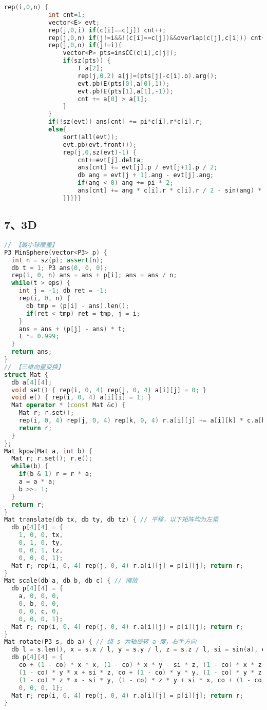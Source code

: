 \begin{lstlisting}[language=C++]
		rep(i,0,n) {
			int cnt=1;
			vector<E> evt;
			rep(j,0,i) if(c[i]==c[j]) cnt++;
			rep(j,0,n) if(j!=i&&!(c[i]==c[j])&&overlap(c[j],c[i])) cnt++;
			rep(j,0,n) if(j!=i){
				vector<P> pts=insCC(c[i],c[j]);
				if(sz(pts)) {
					T a[2];
					rep(j,0,2) a[j]=(pts[j]-c[i].o).arg();
					evt.pb(E(pts[0],a[0],1));
					evt.pb(E(pts[1],a[1],-1));
					cnt += a[0] > a[1];
				}
			}
			if(!sz(evt)) ans[cnt] += pi*c[i].r*c[i].r;
			else{
				sort(all(evt));
				evt.pb(evt.front());
				rep(j,0,sz(evt)-1) {
					cnt+=evt[j].delta;
					ans[cnt] += evt[j].p / evt[j+1].p / 2;
					db ang = evt[j + 1].ang - evt[j].ang;
					if(ang < 0) ang += pi * 2;
					ans[cnt] += ang * c[i].r * c[i].r / 2 - sin(ang) * c[i].r * c[i].r / 2;
				}}}}}
\end{lstlisting}
\subsection{7、3D}
\begin{lstlisting}[language=C++]
// 【最小球覆盖】
P3 MinSphere(vector<P3> p) {
  int n = sz(p); assert(n);
  db t = 1; P3 ans(0, 0, 0);
  rep(i, 0, n) ans = ans + p[i]; ans = ans / n;
  while(t > eps) {
    int j = -1; db ret = -1;
    rep(i, 0, n) {
      db tmp = (p[i] - ans).len();
      if(ret < tmp) ret = tmp, j = i;
    }
    ans = ans + (p[j] - ans) * t;
    t *= 0.999;
  }
  return ans;
}
// 【三维向量变换】
struct Mat {
  db a[4][4];
  void set() { rep(i, 0, 4) rep(j, 0, 4) a[i][j] = 0; }
  void e() { rep(i, 0, 4) a[i][i] = 1; }
  Mat operator * (const Mat &c) {
    Mat r; r.set();
    rep(i, 0, 4) rep(j, 0, 4) rep(k, 0, 4) r.a[i][j] += a[i][k] * c.a[k][j];
    return r;
  }
};
Mat kpow(Mat a, int b) {
  Mat r; r.set(); r.e();
  while(b) {
    if(b & 1) r = r * a;
    a = a * a;
    b >>= 1;
  }
  return r;
}
Mat translate(db tx, db ty, db tz) { // 平移，以下矩阵均为左乘
  db p[4][4] = {
    1, 0, 0, tx, 
    0, 1, 0, ty,
    0, 0, 1, tz,
    0, 0, 0, 1};
  Mat r; rep(i, 0, 4) rep(j, 0, 4) r.a[i][j] = p[i][j]; return r;
}
Mat scale(db a, db b, db c) { // 缩放
  db p[4][4] = {
    a, 0, 0, 0,
    0, b, 0, 0,
    0, 0, c, 0,
    0, 0, 0, 1};
  Mat r; rep(i, 0, 4) rep(j, 0, 4) r.a[i][j] = p[i][j]; return r;
}
Mat rotate(P3 s, db a) { // 绕 s 为轴旋转 a 度，右手方向
  db l = s.len(), x = s.x / l, y = s.y / l, z = s.z / l, si = sin(a), co = cos(a);
  db p[4][4] = {
    co + (1 - co) * x * x, (1 - co) * x * y - si * z, (1 - co) * x * z + si * y, 0,
    (1 - co) * y * x + si * z, co + (1 - co) * y * y, (1 - co) * y * z - si * x, 0,
    (1 - co) * z * x - si * y, (1 - co) * z * y + si * x, co + (1 - co) * z * z, 0,
    0, 0, 0, 1};
  Mat r; rep(i, 0, 4) rep(j, 0, 4) r.a[i][j] = p[i][j]; return r;
}
\end{lstlisting}
